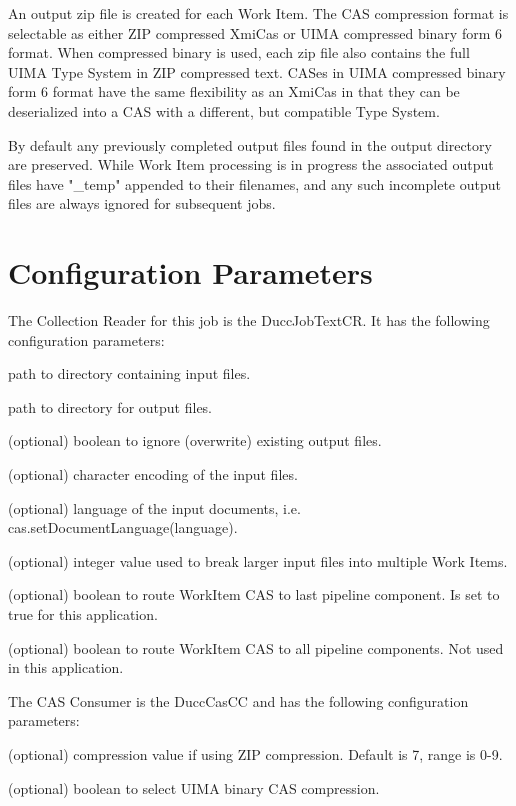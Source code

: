 An output zip file is created for each Work Item. The CAS compression format is selectable as
either ZIP compressed XmiCas or UIMA compressed binary form 6 format. When compressed binary
is used, each zip file also contains the full UIMA Type System in ZIP compressed text.
CASes in UIMA compressed binary form 6 format have the same flexibility as an XmiCas in that
they can be deserialized into a CAS with a different, but compatible Type System.

By default any previously completed output files found in the output directory are preserved.
While Work Item processing is in progress the associated output files have "\_temp" appended to their
filenames, and any such incomplete output files are always ignored for subsequent jobs.

\section{Configuration Parameters}
The Collection Reader for this job is the DuccJobTextCR. It has the following configuration
parameters:

\begin{description}[labelindent=0.5in,leftmargin=0.5in]
    \item[InputDirectory] path to directory containing input files.
    \item[OutputDirectory] path to directory for output files.
    \item[IgnorePreviousOutput] (optional) boolean to ignore (overwrite) existing output files.
    \item[Encoding] (optional) character encoding of the input files.
    \item[Language] (optional) language of the input documents, i.e. cas.setDocumentLanguage(language).
    \item[BlockSize] (optional) integer value used to break larger input files into multiple Work Items.
    \item[SendToLast] (optional) boolean to route WorkItem CAS to last pipeline component. Is set to true for this application.
    \item[SendToAll] (optional) boolean to route WorkItem CAS to all pipeline components. Not used in this application.
\end{description}

The CAS Consumer is the DuccCasCC and has the following configuration parameters:

\begin{description}[labelindent=0.5in,leftmargin=0.5in]
  \item[XmiCompressionLevel] (optional) compression value if using ZIP compression. Default is 7, range is 0-9.
  \item[UseBinaryCompression] (optional) boolean to select UIMA binary CAS compression.
\end{description}

